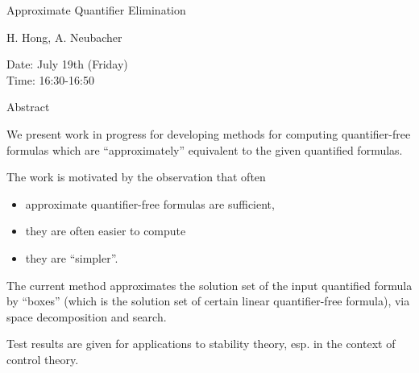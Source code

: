 \begin{center}
\LARGE
Approximate Quantifier Elimination
\end{center}

\begin{center}
\Large
H. Hong, A. Neubacher

\end{center}

\noindent
Date:  July 19th (Friday)\\
Time:  16:30-16:50\\

\begin{center}
\large
Abstract
\end{center}

We present work in progress for developing methods for computing quantifier-free formulas
which are ``approximately'' equivalent to the given quantified formulas. 

The work is motivated by the observation that often 

\begin{itemize}

\item
approximate quantifier-free formulas are sufficient, 

\item
they are often easier to compute 

\item
they are ``simpler''. 

\end{itemize}

The current method approximates the solution set of the input
quantified formula by ``boxes''
(which is the solution set of certain linear quantifier-free formula), via space decomposition and
search. 

Test results are given for applications to stability theory, esp. in the context of control theory. 

